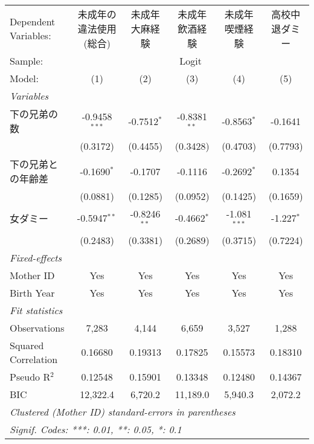 \documentclass{article}
\begin{document}
\begin{landscape}


\begingroup
\centering
\begin{tabular}{lccccc}
   \tabularnewline \midrule \midrule
   Dependent Variables: & 未成年の違法使用(総合) & 未成年大麻経験 & 未成年飲酒経験 & 未成年喫煙経験 & 高校中退ダミー\\  
   Sample: & \multicolumn{5}{c}{Logit} \\ 
   Model:               & (1)                    & (2)            & (3)            & (4)            & (5)\\  
   \midrule
   \emph{Variables}\\
   下の兄弟の数         & -0.9458$^{***}$        & -0.7512$^{*}$  & -0.8381$^{**}$ & -0.8563$^{*}$  & -0.1641\\   
                        & (0.3172)               & (0.4455)       & (0.3428)       & (0.4703)       & (0.7793)\\   
   下の兄弟との年齢差   & -0.1690$^{*}$          & -0.1707        & -0.1116        & -0.2692$^{*}$  & 0.1354\\   
                        & (0.0881)               & (0.1285)       & (0.0952)       & (0.1425)       & (0.1659)\\   
   女ダミー             & -0.5947$^{**}$         & -0.8246$^{**}$ & -0.4662$^{*}$  & -1.081$^{***}$ & -1.227$^{*}$\\   
                        & (0.2483)               & (0.3381)       & (0.2689)       & (0.3715)       & (0.7224)\\   
   \midrule
   \emph{Fixed-effects}\\
   Mother ID            & Yes                    & Yes            & Yes            & Yes            & Yes\\  
   Birth Year           & Yes                    & Yes            & Yes            & Yes            & Yes\\  
   \midrule
   \emph{Fit statistics}\\
   Observations         & 7,283                  & 4,144          & 6,659          & 3,527          & 1,288\\  
   Squared Correlation  & 0.16680                & 0.19313        & 0.17825        & 0.15573        & 0.18310\\  
   Pseudo R$^2$         & 0.12548                & 0.15901        & 0.13348        & 0.12480        & 0.14367\\  
   BIC                  & 12,322.4               & 6,720.2        & 11,189.0       & 5,940.3        & 2,072.2\\  
   \midrule \midrule
   \multicolumn{6}{l}{\emph{Clustered (Mother ID) standard-errors in parentheses}}\\
   \multicolumn{6}{l}{\emph{Signif. Codes: ***: 0.01, **: 0.05, *: 0.1}}\\
\end{tabular}
\par\endgroup


\end{landscape}
\end{document}
